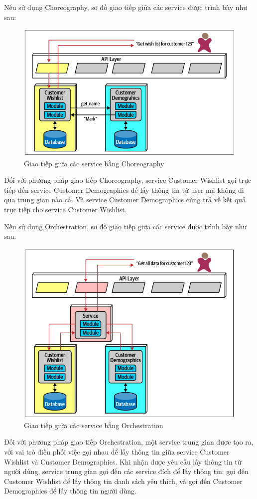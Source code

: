 \par Nếu sử dụng Choreography, sơ đồ giao tiếp giữa các service được trình bày như sau:
\begin{figure}[!htp]
	\centering
	\includegraphics[width=17cm]{img/Architecture/choreography.PNG}
	\newline
	\caption{Giao tiếp giữa các service bằng Choreography}
\end{figure}
Đối với phương pháp giao tiếp Choreography, service Customer Wishlist gọi trực tiếp đến service Customer Demographics để lấy thông tin từ user mà không đi qua trung gian nào cả. Và service Customer Demographics cũng trả về kết quả trực tiếp cho service Customer Wishlist.

\par Nếu sử dụng Orchestration, sơ đồ giao tiếp giữa các service được trình bày như sau:
\begin{figure}[!htp]
	\centering
	\includegraphics[width=17cm]{img/Architecture/orchestration.PNG}
	\newline
	\caption{Giao tiếp giữa các service bằng Orchestration}
\end{figure}
Đối với phương pháp giao tiếp Orchestration, một service trung gian được tạo ra, với vai trò điều phối việc gọi nhau để lấy thông tin giữa service Customer Wishlist và Customer Demographics. Khi nhận được yêu cầu lấy thông tin từ người dùng, service trung gian gọi đến các service đích để lấy thông tin: gọi đến Customer Wishlist để lấy thông tin danh sách yêu thích, và gọi đến Customer Demographics để lấy thông tin người dùng.

